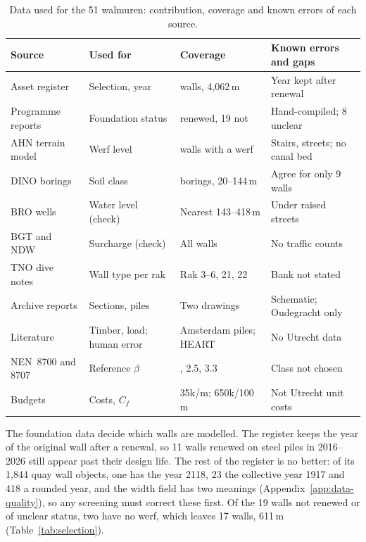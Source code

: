 \begin{table}[htbp]
\centering
\small
\caption{Data used for the 51 walmuren: contribution, coverage and known
errors of each source.}
\label{tab:data-sources}
\begin{tabularx}{\textwidth}{@{}>{\raggedright\arraybackslash}p{4.9cm}
  >{\raggedright\arraybackslash}p{2.6cm}
  >{\raggedright\arraybackslash}p{2.9cm} >{\raggedright\arraybackslash}X@{}}
\toprule
Source & Used for & Coverage & Known errors and gaps \\
\midrule
Asset register \parencite{gu2025register} & Selection, year & 51 walls, 4{,}062\,m & Year kept after renewal \\
Programme reports \parencite{antea2019,gu2025up} & Foundation status & 32 renewed, 19 not & Hand-compiled; 8 unclear \\
AHN terrain model \parencite{ahn} & Werf level & 38 walls with a werf & Stairs, streets; no canal bed \\
DINO borings \parencite{dino} & Soil class & 71 borings, 20--144\,m & Agree for only 9 walls \\
BRO wells \parencite{bro_gmw} & Water level (check) & Nearest 143--418\,m & Under raised streets \\
BGT and NDW \parencite{bgt,ndw} & Surcharge (check) & All walls & No traffic counts \\
TNO dive notes \parencite{tno2009} & Wall type per rak & Rak 3--6, 21, 22 & Bank not stated \\
Archive reports \parencite{erfgoed156,erfgoed158,ibu2010} & Sections, piles & Two drawings & Schematic; Oudegracht only \\
Literature \parencite{hemel2023,hemel2024,williams1986heart} & Timber, load; human error & Amsterdam piles; HEART & No Utrecht data \\
NEN~8700 and 8707 \parencite{nen8700,nen8707} & Reference $\beta$ & 1.8, 2.5, 3.3 & Class not chosen \\
Budgets \parencite{utrecht_programmaplan,amsterdam_tender} & Costs, $C_f$ & \texteuro{}35k/m; \texteuro{}650k/100\,m & Not Utrecht unit costs \\
\bottomrule
\end{tabularx}
\end{table}

The foundation data decide which walls are modelled. The register keeps the
year of the original wall after a renewal, so 11 walls renewed on steel piles
in 2016--2026 still appear past their design life. The rest of the register is no better: of its 1{,}844 quay wall objects, one has the
year 2118, 23 the collective year 1917 and 418 a rounded year, and the width
field has two meanings (Appendix~\ref{app:data-quality}), so any screening
must correct these first. Of the 19 walls not renewed
or of unclear status, two have no werf, which leaves 17 walls, 611\,m
(Table~\ref{tab:selection}).

